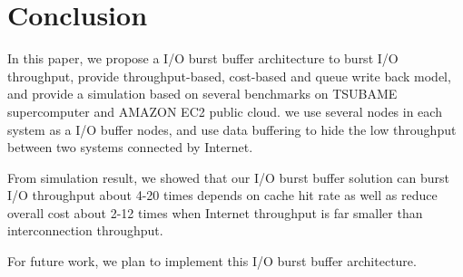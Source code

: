 \section{Conclusion}
\label{sec:conclusion}

In this paper, we propose a I/O burst buffer architecture to burst I/O throughput, provide throughput-based, cost-based and queue write back model, and provide a simulation based on several benchmarks on TSUBAME supercomputer and AMAZON EC2 public cloud.
we use several nodes in each system as a I/O buffer nodes, and use data buffering to hide the low throughput between two systems connected by Internet.

From simulation result, we showed that our I/O burst buffer solution can burst I/O throughput about 4-20 times depends on cache hit rate as well as reduce overall cost about 2-12 times when Internet throughput is far smaller than interconnection throughput.

For future work, we plan to implement this I/O burst buffer architecture.
